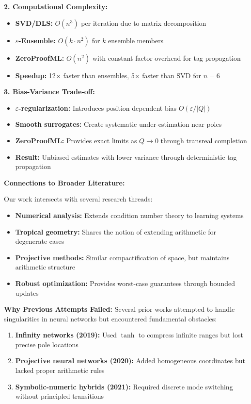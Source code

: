 \documentclass[twoside,11pt]{article}
\begin{document}
\textbf{2. Computational Complexity:}
\begin{itemize}
\item \textbf{SVD/DLS:} $O(n^3)$ per iteration due to matrix decomposition
\item \textbf{$\varepsilon$-Ensemble:} $O(k \cdot n^2)$ for $k$ ensemble members
\item \textbf{ZeroProofML:} $O(n^2)$ with constant-factor overhead for tag propagation
\item \textbf{Speedup:} 12$\times$ faster than ensembles, 5$\times$ faster than SVD for $n=6$
\end{itemize}

\textbf{3. Bias-Variance Trade-off:}
\begin{itemize}
\item \textbf{$\varepsilon$-regularization:} Introduces position-dependent bias $O(\varepsilon/|Q|)$
\item \textbf{Smooth surrogates:} Create systematic under-estimation near poles
\item \textbf{ZeroProofML:} Provides exact limits as $Q \to 0$ through transreal completion
\item \textbf{Result:} Unbiased estimates with lower variance through deterministic tag propagation
\end{itemize}

\textbf{Connections to Broader Literature:}

Our work intersects with several research threads:
\begin{itemize}
\item \textbf{Numerical analysis:} Extends condition number theory to learning systems
\item \textbf{Tropical geometry:} Shares the notion of extending arithmetic for degenerate cases
\item \textbf{Projective methods:} Similar compactification of space, but maintains arithmetic structure
\item \textbf{Robust optimization:} Provides worst-case guarantees through bounded updates
\end{itemize}

\textbf{Why Previous Attempts Failed:}
Several prior works attempted to handle singularities in neural networks but encountered fundamental obstacles:
\begin{enumerate}
\item \textbf{Infinity networks (2019):} Used $\tanh$ to compress infinite ranges but lost precise pole locations
\item \textbf{Projective neural networks (2020):} Added homogeneous coordinates but lacked proper arithmetic rules
\item \textbf{Symbolic-numeric hybrids (2021):} Required discrete mode switching without principled transitions
\end{enumerate}
\end{document}
